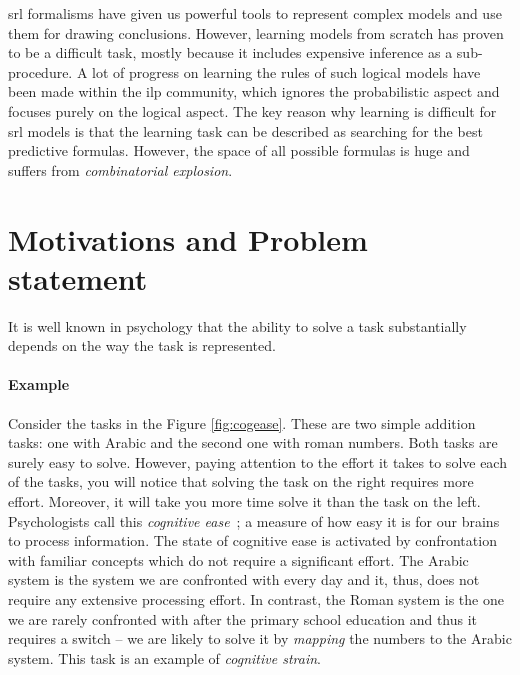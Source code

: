 \gls{srl} formalisms have given us powerful tools to represent complex models and use them for drawing conclusions.
However, learning models from scratch has proven to be a difficult task, mostly because it includes expensive inference as a sub-procedure.
A lot of progress on learning the rules of such logical models have been made within the \gls{ilp} community, which ignores the probabilistic aspect and focuses purely on the logical aspect.
The key reason why learning is difficult for \gls{srl} models is that the learning task can be described as searching for the best predictive formulas.
However, the space of all possible formulas is huge and suffers from \textit{combinatorial explosion}.










\section{Motivations and Problem statement}

It is well known in psychology that the ability to solve a task substantially depends on the way the task is represented.




\paragraph{Example} Consider the tasks in the Figure \ref{fig:cogease}.
These are two simple addition tasks: one with Arabic and the second one with roman numbers.
Both tasks are surely easy to solve.
However, paying attention to the effort it takes to solve each of the tasks, you will notice that solving the task on the right requires more effort.
Moreover, it will take you more time solve it than the task on the left.
Psychologists call this \textit{cognitive ease}~\cite{kahneman2011thinking}; a measure of how easy it is for our brains to process information.
The state of cognitive ease is activated by confrontation with familiar concepts which do not require a significant effort.
The Arabic system is the system we are confronted with every day and it, thus, does not require any extensive processing effort.
In contrast, the Roman system is the one we are rarely confronted with after the primary school education and thus it requires a switch -- we are likely to solve it by \textit{mapping} the numbers to the Arabic system.
This task is an example of \textit{cognitive strain}.


